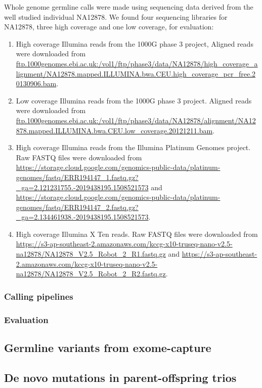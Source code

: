 \documentclass{article}
\begin{document}
Whole genome germline calls were made using sequencing data derived from the well studied individual NA12878. We found four sequencing libraries for NA12878, three high coverage and one low coverage, for evaluation:

\begin{enumerate}
    \item High coverage Illumina reads from the 1000G phase 3 project, Aligned reads were downloaded from \url{ftp.1000genomes.ebi.ac.uk:/vol1/ftp/phase3/data/NA12878/high_coverage_alignment/NA12878.mapped.ILLUMINA.bwa.CEU.high_coverage_pcr_free.20130906.bam}.
    \item Low coverage Illumina reads from the 1000G phase 3 project. Aligned reads were downloaded from \url{ftp.1000genomes.ebi.ac.uk:/vol1/ftp/phase3/data/NA12878/alignment/NA12878.mapped.ILLUMINA.bwa.CEU.low_coverage.20121211.bam}.
    \item High coverage Illumina reads from the Illumina Platinum Genomes project. Raw FASTQ files were downloaded from \url{https://storage.cloud.google.com/genomics-public-data/platinum-genomes/fastq/ERR194147_1.fastq.gz?_ga=2.121231755.-2019438195.1508521573} and \url{https://storage.cloud.google.com/genomics-public-data/platinum-genomes/fastq/ERR194147_2.fastq.gz?_ga=2.134461938.-2019438195.1508521573}.
    \item High coverage Illumina X Ten reads. Raw FASTQ files were downloaded from \url{https://s3-ap-southeast-2.amazonaws.com/kccg-x10-truseq-nano-v2.5-na12878/NA12878_V2.5_Robot_2_R1.fastq.gz} and \url{https://s3-ap-southeast-2.amazonaws.com/kccg-x10-truseq-nano-v2.5-na12878/NA12878_V2.5_Robot_2_R2.fastq.gz}.
\end{enumerate}

\subsubsection{Calling pipelines}

\subsubsection{Evaluation}

\subsection{Germline variants from exome-capture}

\subsection{De novo mutations in parent-offspring trios}
\end{document}
